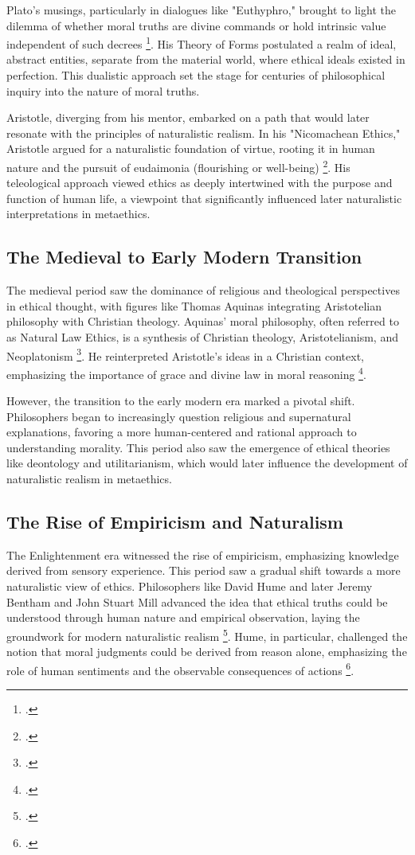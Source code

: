 \documentclass[12pt,a4paper]{article}
\begin{document}
Plato’s musings, particularly in dialogues like "Euthyphro," brought to light the dilemma of whether moral truths are divine commands or hold intrinsic value independent of such decrees \footcite{Wiles2014}. His Theory of Forms postulated a realm of ideal, abstract entities, separate from the material world, where ethical ideals existed in perfection. This dualistic approach set the stage for centuries of philosophical inquiry into the nature of moral truths. 

Aristotle, diverging from his mentor, embarked on a path that would later resonate with the principles of naturalistic realism. In his "Nicomachean Ethics," Aristotle argued for a naturalistic foundation of virtue, rooting it in human nature and the pursuit of eudaimonia (flourishing or well-being) \footcite{Leibowitz2013}. His teleological approach viewed ethics as deeply intertwined with the purpose and function of human life, a viewpoint that significantly influenced later naturalistic interpretations in metaethics.

\subsection{The Medieval to Early Modern Transition}
The medieval period saw the dominance of religious and theological perspectives in ethical thought, with figures like Thomas Aquinas integrating Aristotelian philosophy with Christian theology. Aquinas' moral philosophy, often referred to as Natural Law Ethics, is a synthesis of Christian theology, Aristotelianism, and Neoplatonism \footcite{Stančienė2014}. He reinterpreted Aristotle’s ideas in a Christian context, emphasizing the importance of grace and divine law in moral reasoning \footcite{Shanley2002}. 

However, the transition to the early modern era marked a pivotal shift. Philosophers began to increasingly question religious and supernatural explanations, favoring a more human-centered and rational approach to understanding morality. This period also saw the emergence of ethical theories like deontology and utilitarianism, which would later influence the development of naturalistic realism in metaethics.

\subsection{The Rise of Empiricism and Naturalism}
The Enlightenment era witnessed the rise of empiricism, emphasizing knowledge derived from sensory experience. This period saw a gradual shift towards a more naturalistic view of ethics. Philosophers like David Hume and later Jeremy Bentham and John Stuart Mill advanced the idea that ethical truths could be understood through human nature and empirical observation, laying the groundwork for modern naturalistic realism \footcite{Skorupski2021}. Hume, in particular, challenged the notion that moral judgments could be derived from reason alone, emphasizing the role of human sentiments and the observable consequences of actions \footcite{Ducheyne2017}.
\end{document}
